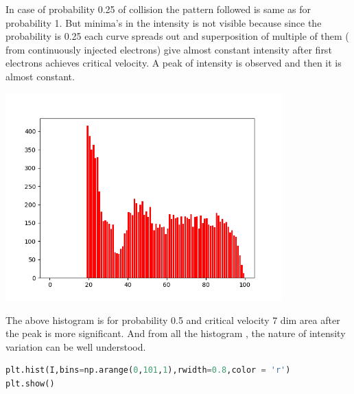 \documentclass[a4paper]{article}
\begin{document}
In case of probability 0.25 of collision the pattern followed is same as for probability 1. But minima's in the intensity is not visible because since the probability is 0.25 each curve spreads out and superposition of multiple of them ( from continuously injected electrons) give almost constant intensity after first electrons achieves critical velocity. A peak of intensity is observed and then it is almost constant.  
\begin{center}
\includegraphics[width=0.8\textwidth]{Figure_1-v3.png}
\end{center}
The above histogram is for probability 0.5 and critical velocity 7 dim area after the peak is more significant. And from all the histogram , the nature of intensity variation can be well understood.
\begin{lstlisting}[language=Python]
plt.hist(I,bins=np.arange(0,101,1),rwidth=0.8,color = 'r')
plt.show()
\end{lstlisting}
\end{document}
